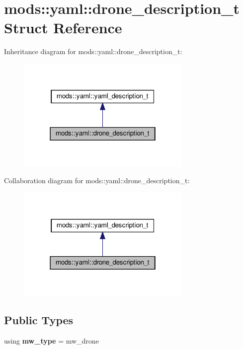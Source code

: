 \hypertarget{structmods_1_1yaml_1_1drone__description__t}{}\section{mods\+:\+:yaml\+:\+:drone\+\_\+description\+\_\+t Struct Reference}
\label{structmods_1_1yaml_1_1drone__description__t}


Inheritance diagram for mods\+:\+:yaml\+:\+:drone\+\_\+description\+\_\+t\+:
\nopagebreak
\begin{figure}[H]
\begin{center}
\leavevmode
\includegraphics[width=238pt]{structmods_1_1yaml_1_1drone__description__t__inherit__graph}
\end{center}
\end{figure}


Collaboration diagram for mods\+:\+:yaml\+:\+:drone\+\_\+description\+\_\+t\+:
\nopagebreak
\begin{figure}[H]
\begin{center}
\leavevmode
\includegraphics[width=238pt]{structmods_1_1yaml_1_1drone__description__t__coll__graph}
\end{center}
\end{figure}
\subsection*{Public Types}
\begin{DoxyCompactItemize}
\item 
\mbox{\label{structmods_1_1yaml_1_1drone__description__t_a2d4d810103913975aac20e0b00374d29}} 
using {\bfseries mw\+\_\+type} = mw\+\_\+drone
\end{DoxyCompactItemize}
